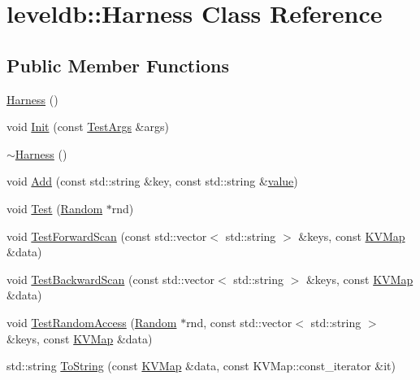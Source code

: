 \hypertarget{classleveldb_1_1_harness}{}\section{leveldb\+:\+:Harness Class Reference}
\label{classleveldb_1_1_harness}
\subsection*{Public Member Functions}
\begin{DoxyCompactItemize}
\item 
\hyperlink{classleveldb_1_1_harness_a37601b2f232e45cb7607aa8d2ecb25db}{Harness} ()
\item 
void \hyperlink{classleveldb_1_1_harness_a2aba24255691eaad2a57ee43cbc9ddc1}{Init} (const \hyperlink{structleveldb_1_1_test_args}{Test\+Args} \&args)
\item 
\hyperlink{classleveldb_1_1_harness_a9956e6945c11e5024ae1f82fd8528343}{$\sim$\+Harness} ()
\item 
void \hyperlink{classleveldb_1_1_harness_a019ddc8e52dc5cfaac85f53993ab1ed4}{Add} (const std\+::string \&key, const std\+::string \&\hyperlink{cache_8cc_a0f61d63b009d0880a89c843bd50d8d76}{value})
\item 
void \hyperlink{classleveldb_1_1_harness_a78dbb5352b51e22bbc449bad7c1a9176}{Test} (\hyperlink{classleveldb_1_1_random}{Random} $\ast$rnd)
\item 
void \hyperlink{classleveldb_1_1_harness_ac5ff108406a08a6e3e22318246d206ef}{Test\+Forward\+Scan} (const std\+::vector$<$ std\+::string $>$ \&keys, const \hyperlink{namespaceleveldb_aac1e50450147be263e08252c6700f7a7}{K\+V\+Map} \&data)
\item 
void \hyperlink{classleveldb_1_1_harness_aba7a2c48101cd9d024be64080ebed363}{Test\+Backward\+Scan} (const std\+::vector$<$ std\+::string $>$ \&keys, const \hyperlink{namespaceleveldb_aac1e50450147be263e08252c6700f7a7}{K\+V\+Map} \&data)
\item 
void \hyperlink{classleveldb_1_1_harness_adb4b24bd89b600a67b0cd52ff64af9cd}{Test\+Random\+Access} (\hyperlink{classleveldb_1_1_random}{Random} $\ast$rnd, const std\+::vector$<$ std\+::string $>$ \&keys, const \hyperlink{namespaceleveldb_aac1e50450147be263e08252c6700f7a7}{K\+V\+Map} \&data)
\item 
std\+::string \hyperlink{classleveldb_1_1_harness_a69962f92cdd4fdc5d1f91d8c3cbebb3f}{To\+String} (const \hyperlink{namespaceleveldb_aac1e50450147be263e08252c6700f7a7}{K\+V\+Map} \&data, const K\+V\+Map\+::const\+\_\+iterator \&it)

\end{DoxyCompactItemize}
